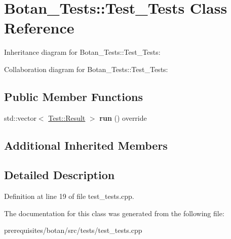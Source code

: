 \hypertarget{class_botan___tests_1_1_test___tests}{}\section{Botan\+\_\+\+Tests\+:\+:Test\+\_\+\+Tests Class Reference}
\label{class_botan___tests_1_1_test___tests}


Inheritance diagram for Botan\+\_\+\+Tests\+:\+:Test\+\_\+\+Tests\+:


Collaboration diagram for Botan\+\_\+\+Tests\+:\+:Test\+\_\+\+Tests\+:
\subsection*{Public Member Functions}
\begin{DoxyCompactItemize}
\item 
\mbox{\label{class_botan___tests_1_1_test___tests_a80c56fb03429ab6b4b438b07bec164eb}} 
std\+::vector$<$ \mbox{\hyperlink{class_botan___tests_1_1_test_1_1_result}{Test\+::\+Result}} $>$ {\bfseries run} () override
\end{DoxyCompactItemize}
\subsection*{Additional Inherited Members}


\subsection{Detailed Description}


Definition at line 19 of file test\+\_\+tests.\+cpp.



The documentation for this class was generated from the following file\+:\begin{DoxyCompactItemize}
\item 
prerequisites/botan/src/tests/test\+\_\+tests.\+cpp\end{DoxyCompactItemize}
